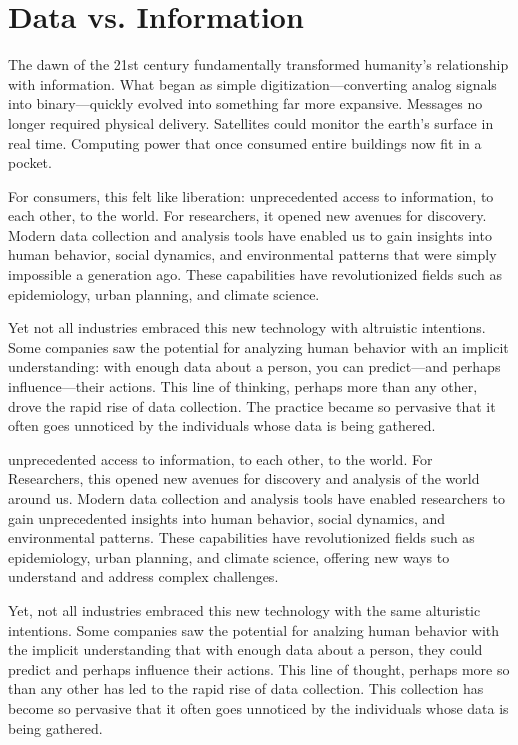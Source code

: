 \section{Data vs. Information}

The dawn of the 21st century fundamentally transformed humanity's relationship with information. What began as simple digitization---converting analog signals into binary---quickly evolved into something far more expansive. Messages no longer required physical delivery. Satellites could monitor the earth's surface in real time. Computing power that once consumed entire buildings now fit in a pocket.

For consumers, this felt like liberation: unprecedented access to information, to each other, to the world. For researchers, it opened new avenues for discovery. Modern data collection and analysis tools have enabled us to gain insights into human behavior, social dynamics, and environmental patterns that were simply impossible a generation ago. These capabilities have revolutionized fields such as epidemiology, urban planning, and climate science.

Yet not all industries embraced this new technology with altruistic intentions. Some companies saw the potential for analyzing human behavior with an implicit understanding: with enough data about a person, you can predict---and perhaps influence---their actions. This line of thinking, perhaps more than any other, drove the rapid rise of data collection. The practice became so pervasive that it often goes unnoticed by the individuals whose data is being gathered.

unprecedented access to information, to each other, to the world.
For Researchers, this opened new avenues for discovery and analysis of the world around us. 
Modern data collection and analysis tools have enabled researchers to gain unprecedented insights into human behavior, social dynamics, and environmental patterns. 
These capabilities have revolutionized fields such as epidemiology, urban planning, and climate science, offering new ways to understand and address complex challenges.

Yet, not all industries embraced this new technology with the same alturistic intentions. 
Some companies saw the potential for analzing human behavior with the implicit understanding that with enough data about a person, they could predict and perhaps influence their actions. 
This line of thought, perhaps more so than any other has led to the rapid rise of data collection. This collection has become so pervasive that it often goes unnoticed by the individuals whose data is being gathered.

